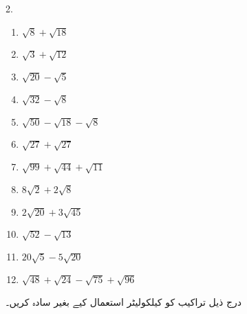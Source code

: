 \begin{multicols}{2.}
\begin{enumerate}
\item
\(\sqrt{8}+\sqrt{18}\)
\item
\(\sqrt{3}+\sqrt{12}\)
\item
\(\sqrt{20}-\sqrt{5}\)
\item
\(\sqrt{32}-\sqrt{8}\)
\item
\(\sqrt{50}-\sqrt{18}-\sqrt{8}\)
\item
\(\sqrt{27}+\sqrt{27}\)
\item
\(\sqrt{99}+\sqrt{44}+\sqrt{11}\)
\item
\(8\sqrt{2}+2\sqrt{8}\)
\item
\(2\sqrt{20}+3\sqrt{45}\)
\item
\(\sqrt{52}-\sqrt{13}\)
\item
\(20\sqrt{5}-5\sqrt{20}\)
\item
\(\sqrt{48}+\sqrt{24}-\sqrt{75}+\sqrt{96}\)
\end{enumerate}
\end{multicols}
درج ذیل تراکیب کو کیلکولیٹر استعمال کیے بغیر سادہ کریں۔

